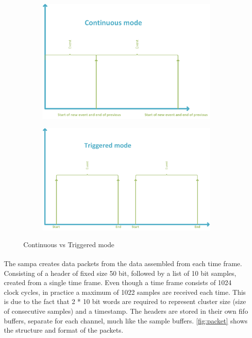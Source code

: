 \documentclass[a4paper, 12pt]{report}\dfrac{\right }{•}
\begin{document}
\begin{figure}[t!]
	\centering
		\begin{subfigure}[]{0.9\textwidth}
			\label{fig:cont}
			\includegraphics[width=\textwidth]{images/cont-mode.png}
		\end{subfigure}
		\begin{subfigure}[]{0.9\textwidth}
			\label{fig:trig}
			\includegraphics[width=\textwidth]{images/triggered-mode.png}
		\end{subfigure}
	\caption{Continuous vs Triggered mode}
	\label{fig:cont-vs-trig}
\end{figure}

\paragraph{}
The \gls{sampa} creates data packets from the data assembled from each time frame.
Consisting of a header of fixed size 50 bit, followed by a list of 10 bit samples, created from a single time frame.
Even though a time frame consists of 1024 clock cycles, in practice a maximum of 1022 samples are received each time.
This is due to the fact that 2 * 10 bit words are required to represent cluster size (size of consecutive samples) and a timestamp.
The headers are stored in their own \gls{fifo} buffers, separate for each channel, much like the sample buffers.
\ref{fig:packet} shows the structure and format of the packets.
\end{document}
